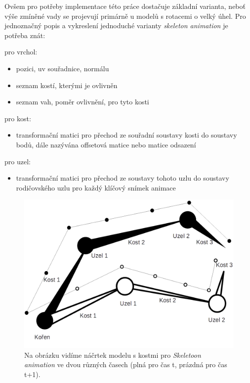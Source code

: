Ovšem pro potřeby implementace této práce dostačuje základní varianta, neboť výše zmíněné vady se projevují primárně u modelů s rotacemi o velký úhel. Pro jednoznačný popis a vykreslení jednoduché varianty \emph{skeleton animation} je potřeba znát:
\begin{itemize}
	\begin{item}
		pro vrchol:
			\begin{itemize}			
			\item pozici, uv souřadnice, normálu
			\item seznam kostí, kterými je ovlivněn
			\item seznam vah, poměr ovlivnění, pro tyto kosti
		\end{itemize}
	\end{item}
	\begin{item}
	pro kost:
	\begin{itemize}
		\item transformační matici pro přechod ze souřadní soustavy kosti do soustavy bodů, dále nazývána offsetová matice nebo matice odsazení 
	\end{itemize}

\end{item}
	\begin{item}
	pro uzel:
	\begin{itemize}
		\item transformační matici pro přechod ze soustavy tohoto uzlu do soustavy rodičovského uzlu pro každý klíčový snímek animace
	\end{itemize}
	
\end{item}
	
\end{itemize}  
\begin{figure}
\begin{center}

\includegraphics[scale=0.33 ]{obrazky-figures/skeletalAnimation}
\caption{Na obrázku vidíme náčrtek modelu s kostmi pro \emph{Skeletoon animation} ve dvou různých časech (plná pro čas t, prázdná pro čas t+1).}\label{skeletalAnimation}
\end{center}\end{figure}
